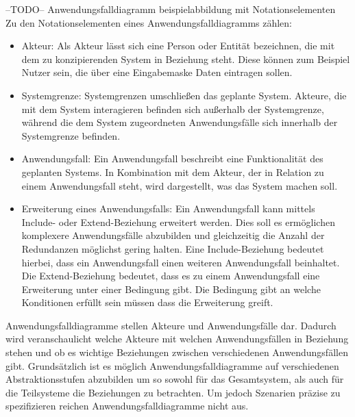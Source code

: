 --TODO-- Anwendungsfalldiagramm beispielabbildung mit Notationselementen\\

Zu den Notationselementen eines Anwendungsfalldiagramms z\"ahlen:
\begin{itemize}
\item Akteur: Als Akteur l\"asst sich eine Person oder Entit\"at bezeichnen, die mit dem zu konzipierenden System in Beziehung steht. Diese k\"onnen zum Beispiel Nutzer sein, die \"uber eine Eingabemaske Daten eintragen sollen.
\item Systemgrenze: Systemgrenzen umschlie\ss{}en das geplante System. Akteure, die mit dem System interagieren befinden sich au\ss{}erhalb der Systemgrenze, w\"ahrend die dem System zugeordneten Anwendungsf\"alle sich innerhalb der Systemgrenze befinden.
\item Anwendungsfall: Ein Anwendungsfall beschreibt eine Funktionalit\"at des geplanten Systems. In Kombination mit dem Akteur, der in Relation zu einem Anwendungsfall steht, wird dargestellt, was das System machen soll.
\item Erweiterung eines Anwendungsfalls: Ein Anwendungsfall kann mittels Include- oder Extend-Beziehung erweitert werden. Dies soll es erm\"oglichen komplexere Anwendungsf\"alle abzubilden und gleichzeitig die Anzahl der Redundanzen m\"oglichst gering halten. Eine Include-Beziehung bedeutet hierbei, dass ein Anwendungsfall einen weiteren Anwendungsfall beinhaltet. Die Extend-Beziehung bedeutet, dass es zu einem Anwendungsfall eine Erweiterung unter einer Bedingung gibt. Die Bedingung gibt an welche Konditionen erfüllt sein müssen dass die Erweiterung greift.
\end{itemize}
Anwendungsfalldiagramme stellen Akteure und Anwendungsfälle dar. Dadurch wird veranschaulicht welche Akteure mit welchen Anwendungsfällen in Beziehung stehen und ob es wichtige Beziehungen zwischen verschiedenen Anwendungsfällen gibt. Grundsätzlich ist es möglich Anwendungsfalldiagramme auf verschiedenen Abstraktionsstufen abzubilden um so sowohl für das Gesamtsystem, als auch für die Teilsysteme die Beziehungen zu betrachten. Um jedoch Szenarien präzise zu spezifizieren reichen Anwendungsfalldiagramme nicht aus.
